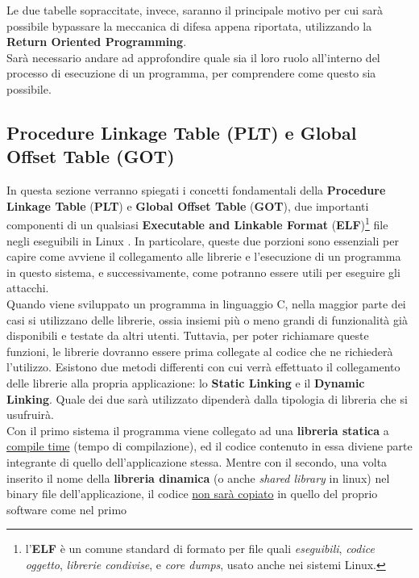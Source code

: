 Le due tabelle sopraccitate, invece, saranno il principale motivo per cui sarà possibile bypassare la meccanica di difesa appena riportata, utilizzando la \textbf{Return Oriented Programming}.\\ 
Sarà necessario andare ad approfondire quale sia il loro ruolo all'interno del processo di esecuzione di un programma, per comprendere come questo sia possibile.

\subsection*{Procedure Linkage Table (PLT) e Global Offset Table (GOT)}
\label{subsec:PLT-GOT}
In questa sezione verranno spiegati i concetti fondamentali della \textbf{Procedure Linkage Table} (\textbf{PLT}) e \textbf{Global Offset Table} (\textbf{GOT}), due importanti componenti di un qualsiasi \textbf{Executable and Linkable Format} (\textbf{ELF})\footnote[1]{l'\textbf{ELF} è un comune standard di formato per file quali \textit{eseguibili}, \textit{codice oggetto}, \textit{librerie condivise}, e \textit{core dumps}, usato anche nei sistemi Linux.} 
file negli eseguibili in Linux \cite*{ELF}\cite*{ELF2}. In particolare, queste due porzioni sono essenziali per capire come avviene il collegamento alle librerie e l'esecuzione di un programma in questo sistema, e successivamente, come potranno essere utili per eseguire gli attacchi.\\
Quando viene sviluppato un programma in linguaggio C, nella maggior parte dei casi si utilizzano delle librerie, ossia insiemi più o meno grandi di funzionalità già disponibili e testate da altri utenti. Tuttavia, per poter richiamare queste funzioni, le librerie dovranno essere prima collegate al codice 
che ne richiederà l'utilizzo. Esistono due metodi differenti con cui verrà effettuato il collegamento delle librerie alla propria applicazione: lo \textbf{Static Linking} e il \textbf{Dynamic Linking}. Quale dei due sarà utilizzato dipenderà dalla tipologia di libreria che si usufruirà.\cite*{LIBRARY}\\
Con il primo sistema il programma viene collegato ad una \textbf{libreria statica} a \underline{compile time} (tempo di compilazione), ed il codice contenuto in essa diviene parte integrante di quello dell'applicazione stessa. Mentre con il secondo, una volta inserito il nome della \textbf{libreria dinamica} (o anche \textit{shared library} in linux) nel binary file dell'applicazione, il codice \underline{non sarà copiato} in quello del proprio software come nel primo 

